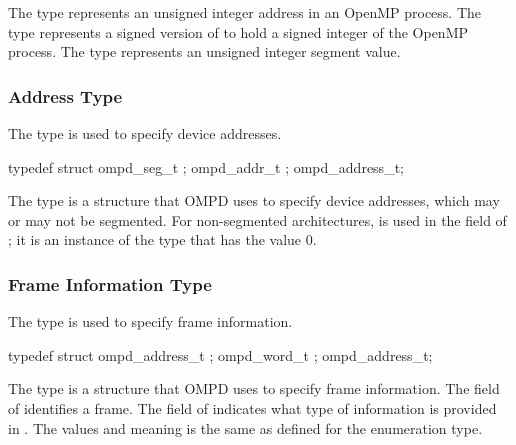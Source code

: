 \descr
The  type represents an unsigned integer address in an
OpenMP process. The  type represents a signed version of 
 to hold a signed integer of the OpenMP process. The 
 type represents an unsigned integer segment value.



\subsubsection{Address Type}
\label{subsubsubsec:ompd_address_t}

\summary
The  type is used to specify device addresses.

\format
\begin{ccppspecific}
\begin{ompEnv}
typedef struct {
  ompd_seg_t ;
  ompd_addr_t ;
} ompd_address_t;
\end{ompEnv}
\end{ccppspecific}

\descr
The  type is a structure that OMPD uses to specify 
device addresses, which may or may not be segmented. For non-segmented 
architectures,  is used in the  
field of ; it is an instance of the  
type that has the value 0.

\subsubsection{Frame Information Type}
\label{subsubsubsec:ompd_frame_info_t}

\summary
The  type is used to specify frame information.

\format
\begin{ccppspecific}
\begin{ompEnv}
typedef struct {
  ompd_address_t ;
  ompd_word_t ;
} ompd_address_t;
\end{ompEnv}
\end{ccppspecific}

\descr
The  type is a structure that OMPD uses to specify 
frame information. The  field of  
identifies a frame.
The  field of  indicates what type
of information is provided in . The values and meaning is
the same as defined for the  enumeration type.

